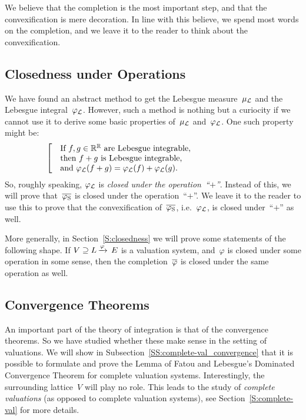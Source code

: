 \documentclass[main.tex]{subfiles}
\begin{document}
We believe that
the completion is the most important step,
and that the convexification
is mere decoration.
In line with this believe,
we spend most words
on the completion,
and we leave it to the reader
to think about the convexification.


\subsection{Closedness under Operations}
We have found an abstract method
to get the Lebesgue measure~$\mu_{\mathcal{L}}$ and
the Lebesgue integral~$\varphi_{\mathcal{L}}$.
However, such a method is nothing but a curiocity
if we cannot use it to derive some
basic properties of~$\mu_{\mathcal{L}}$ and~$\varphi_{\mathcal{L}}$.
One such property might be:
\begin{equation*}
\left[\quad
\begin{minipage}{.7\columnwidth}
If $f,g\in \R^\R$
are Lebesgue integrable,\\
then $f+g$ is Lebesgue integrable,\\
and $\Lphi(f+g) = \Lphi(f)+\Lphi(g)$.
\end{minipage}
\right.
\end{equation*}
So, roughly speaking,
$\varphi_{\mathcal{L}}$ is \emph{closed under the operation~``$+$''}.
Instead of this,
we will prove that~$\overline{\varphi_{\mathrm{S}}}$ is closed under the operation~``$+$''.
We leave it to the reader to use this to prove that the convexification
 of~$\overline{\varphi_{\mathrm{S}}}$, i.e.~$\varphi_{\mathcal{L}}$, is closed under~``$+$'' as well.

More generally,
in Section~\ref{S:closedness}
we will prove some  statements of the following shape.
If $V \supseteq L\,\smash{\xrightarrow{\varphi}\,E}$
is a valuation system,
and~$\varphi$ is closed under some operation in some sense,
then the completion~$\overline{\varphi}$ is closed under the same operation as well.


\subsection{Convergence Theorems}
An important part of the theory of integration
is that of the convergence theorems.
So we have studied whether
these make sense in the setting of valuations.
We will show in Subsection~\ref{SS:complete-val_convergence}
that it is possible to formulate
and prove
the Lemma of Fatou
and Lebesgue's Dominated Convergence Theorem
for complete valuation systems.
Interestingly,
the surrounding lattice~$V$ will play no role.
This leads to the study 
of \emph{complete valuations}
(as opposed to complete valuation systems),
see Section~\ref{S:complete-val} for more details.
\end{document}
